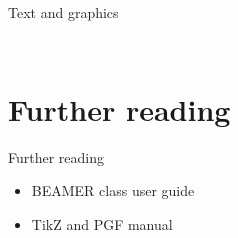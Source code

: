 \documentclass[11pt,t]{beamer}
\begin{document}
\begin{frame}[t]{Text and graphics}
\begin{columns}
\begin{column}{.2\textwidth}
\begin{figure}
			\end{figure}
		\end{column}
	\end{columns}
\end{frame}
\section{Further reading}
\begin{frame}[t]{Further reading}
	\begin{itemize}
		\item BEAMER class user guide
		\item TikZ and PGF manual
	\end{itemize}
\end{frame}
\end{document}
